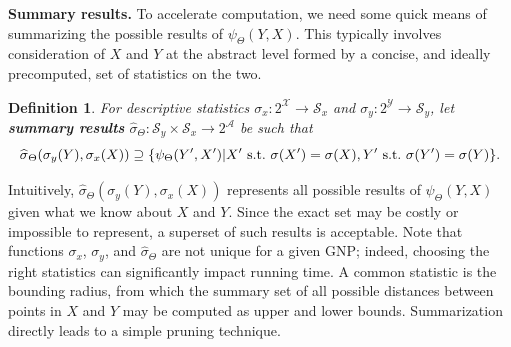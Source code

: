 \documentclass{article}
\newtheorem{definition} {Definition}
\newcommand{\GNP}[1][\psi]{{#1}_{\Theta}}
\newcommand{\sigmahat}{\mathbin{\widehat{\sigma}}}
\newcommand{\st}{{\rm~s.t.~}}
\begin{document}

{\bf Summary results.}
To accelerate computation, we need some quick means of summarizing the possible results of $\GNP(Y,X)$.
This typically involves consideration of $X$ and $Y$ at the abstract level formed by a concise, and ideally precomputed, set of statistics on the two.
\begin{definition}
  For descriptive statistics $\sigma_x \colon 2^{\mathcal{X}} \to
  \mathcal{S}_x$ and $\sigma_y \colon 2^{\mathcal{Y}} \to
  \mathcal{S}_y$, let {\bf summary results} $\GNP[\sigmahat] \colon
  \mathcal{S}_y \times \mathcal{S}_x \to 2^\mathcal{A}$ be such that
  \[
  \GNP[\sigmahat](\sigma_y(Y),\sigma_x(X)) \supseteq \{\GNP(Y',X') | X' \st \sigma(X') = \sigma(X), Y' \st \sigma(Y') = \sigma(Y)\}.
  \]
\end{definition}

\noindent Intuitively, $\GNP[\sigmahat](\sigma_y(Y),\sigma_x(X))$ represents all possible results of $\GNP(Y,X)$ given what we know about $X$ and $Y$.
Since the exact set may be costly or impossible to represent, a superset of such results is acceptable.
Note that functions $\sigma_x$, $\sigma_y$, and $\GNP[\sigmahat]$ are not unique for a given GNP; indeed, choosing the right statistics can significantly impact running time.
A common statistic is the bounding radius, from which the summary set of all possible distances between points in $X$ and $Y$ may be computed as upper and lower bounds.
Summarization directly leads to a simple pruning technique.

\end{document}
